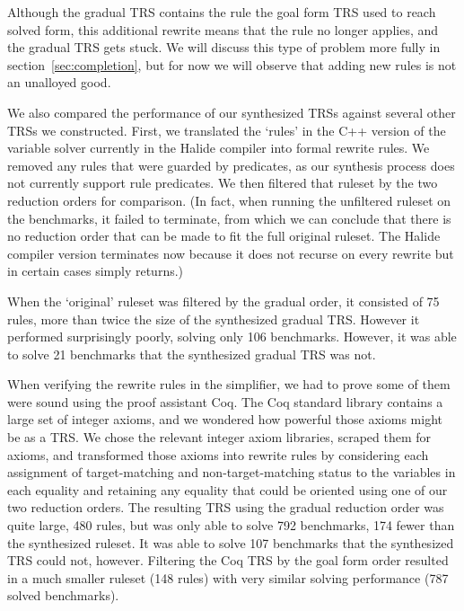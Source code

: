 Although the gradual TRS contains the rule the goal form TRS used to reach solved form, this additional rewrite means that the rule no longer applies, and the gradual TRS gets stuck. We will discuss this type of problem more fully in section~\ref{sec:completion}, but for now we will observe that adding new rules is not an unalloyed good.

We also compared the performance of our synthesized TRSs against several other TRSs we constructed. First, we translated the `rules' in the C++ version of the variable solver currently in the Halide compiler into formal rewrite rules. We removed any rules that were guarded by predicates, as our synthesis process does not currently support rule predicates. We then filtered that ruleset by the two reduction orders for comparison. (In fact, when running the unfiltered ruleset on the benchmarks, it failed to terminate, from which we can conclude that there is no reduction order that can be made to fit the full original ruleset. The Halide compiler version terminates now because it does not recurse on every rewrite but in certain cases simply returns.)

When the `original' ruleset was filtered by the gradual order, it consisted of 75 rules, more than twice the size of the synthesized gradual TRS. However it performed surprisingly poorly, solving only 106 benchmarks. However, it was able to solve 21 benchmarks that the synthesized gradual TRS was not.

When verifying the rewrite rules in the simplifier, we had to prove some of them were sound using the proof assistant Coq. The Coq standard library contains a large set of integer axioms, and we wondered how powerful those axioms might be as a TRS. We chose the relevant integer axiom libraries, scraped them for axioms, and transformed those axioms into rewrite rules by considering each assignment of target-matching and non-target-matching status to the variables in each equality and retaining any equality that could be oriented using one of our two reduction orders. The resulting TRS using the gradual reduction order was quite large, 480 rules, but was only able to solve 792 benchmarks, 174 fewer than the synthesized ruleset. It was able to solve 107 benchmarks that the synthesized TRS could not, however. Filtering the Coq TRS by the goal form order resulted in a much smaller ruleset (148 rules) with very similar solving performance (787 solved benchmarks). 

